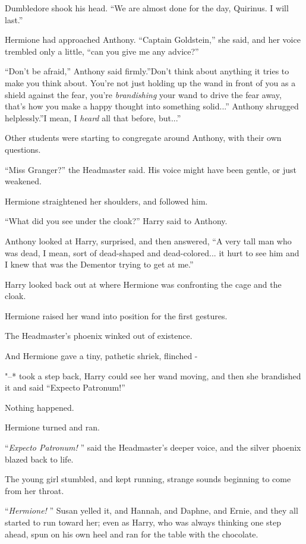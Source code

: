 Dumbledore shook his head. ``We are almost done for the day, Quirinus. I
will last.''

Hermione had approached Anthony. ``Captain Goldstein,'' she said, and
her voice trembled only a little, ``can you give me any advice?''

``Don't be afraid,'' Anthony said firmly.''Don't think about anything it
tries to make you think about. You're not just holding up the wand in
front of you as a shield against the fear, you're \emph{brandishing}
your wand to drive the fear away, that's how you make a happy thought
into something solid...'' Anthony shrugged helplessly.''I mean, I
\emph{heard} all that before, but...''

Other students were starting to congregate around Anthony, with their
own questions.

``Miss Granger?'' the Headmaster said. His voice might have been gentle,
or just weakened.

Hermione straightened her shoulders, and followed him.

``What did you see under the cloak?'' Harry said to Anthony.

Anthony looked at Harry, surprised, and then answered, ``A very tall man
who was dead, I mean, sort of dead-shaped and dead-colored... it
hurt to see him and I knew that was the Dementor trying to get at me.''

Harry looked back out at where Hermione was confronting the cage and the
cloak.

Hermione raised her wand into position for the first gestures.

The Headmaster's phoenix winked out of existence.

And Hermione gave a tiny, pathetic shriek, flinched -

"--* took a step back, Harry could see her wand moving, and then she
brandished it and said ``Expecto Patronum!''

Nothing happened.

Hermione turned and ran.

``\emph{Expecto Patronum!} '' said the Headmaster's deeper voice, and the
silver phoenix blazed back to life.

The young girl stumbled, and kept running, strange sounds beginning to
come from her throat.

``\emph{Hermione!} '' Susan yelled it, and Hannah, and Daphne, and Ernie,
and they all started to run toward her; even as Harry, who was always
thinking one step ahead, spun on his own heel and ran for the table with
the chocolate.

